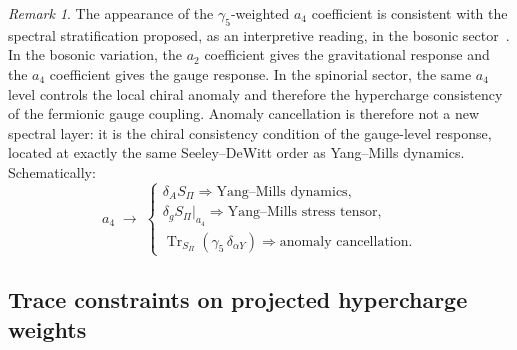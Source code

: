 \documentclass[11pt,a4paper]{article}
\theoremstyle{definition}
\theoremstyle{remark}
\newtheorem{remark}[theorem]{Remark}
\begin{document}
    \begin{remark}
      \label{rem:seeley-dewitt-hierarchy}
      The appearance of the $\gamma_5$-weighted $a_4$ coefficient is consistent with
      the spectral stratification proposed, as an interpretive reading, in the bosonic
      sector~\cite{Beau2026q13}.
      In the bosonic variation, the $a_2$ coefficient gives the gravitational response
      and the $a_4$ coefficient gives the gauge response.
      In the spinorial sector, the same $a_4$ level controls the local chiral anomaly
      and therefore the hypercharge consistency of the fermionic gauge coupling.
      Anomaly cancellation is therefore not a new spectral layer: it is the chiral
      consistency condition of the gauge-level response, located at exactly the same
      Seeley--DeWitt order as Yang--Mills dynamics.
      Schematically:
      \begin{equation}
        \label{eq:a4-two-faces}
        a_4 \;\longrightarrow\;
        \begin{cases}
          \delta_A S_\Pi \Rightarrow \text{Yang--Mills dynamics}, \\[4pt]
          \delta_g S_\Pi\big|_{a_4} \Rightarrow \text{Yang--Mills stress tensor}, \\[4pt]
          \operatorname{Tr}_{S_\Pi}(\gamma_5 \, \delta_{\alpha Y}) \Rightarrow
          \text{anomaly cancellation}.
        \end{cases}
      \end{equation}
    \end{remark}

  \subsection{Trace constraints on projected hypercharge weights}
    \label{ssec:trace-constraints}
\end{document}
